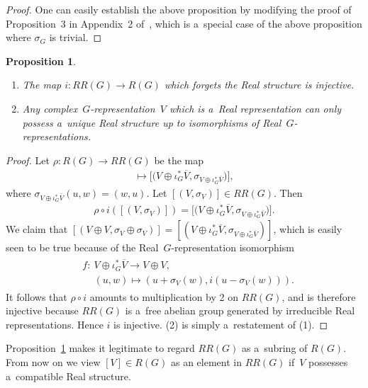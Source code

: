 \documentclass[11pt]{article}
\numberwithin{equation}{section}
\newtheorem{Proposition}[Theorem]{Proposition}
{\theoremstyle{definition}
\newtheorem{Definition}[Theorem]{Definition}
\newtheorem{Example}[Theorem]{Example}
\newtheorem{Remark}[Theorem]{Remark}
}
\begin{document}
\begin{proof}
One can easily establish the above proposition
by modifying the proof of Proposition~3 in Appendix~2 of~\cite{B}, which
is a~special case of the above proposition
where $\sigma_G$ is trivial.
\end{proof}
\begin{Proposition}\label{realforgetfulinj}\quad
\begin{enumerate}\itemsep=0pt
\item[$1.$]
The map
$i: RR(G)\to R(G)$ which forgets the Real structure is injective.
\item[$2.$]
Any complex~$G$-representation~$V$ which is a~Real representation can only possess a~unique Real structure up to
isomorphisms of Real~$G$-representations.
\end{enumerate}
\end{Proposition}
\begin{proof}
Let $\rho: R(G)\to RR(G)$ be the map
\begin{gather*}
[V]\mapsto \big[\big(V\oplus\iota_G^*\overline{V},\sigma_{V\oplus\iota_G^*\overline{V}}\big)\big],
\end{gather*}
where $\sigma_{V\oplus\iota_G^*\overline{V}}(u, w)=(w, u)$.
Let $[(V,
\sigma_V)]\in RR(G)$.
Then
\begin{gather*}
\rho\circ i([(V,\sigma_V)])=\big[\big(V\oplus\iota_G^*\overline{V},\sigma_{V\oplus\iota_G^*\overline{V}}\big)\big].
\end{gather*}
We claim that $[(V\oplus V,\sigma_V\oplus\sigma_V)]=[(V\oplus\iota_G^*\overline{V},
\sigma_{V\oplus\iota_G^*\overline{V}})]$, which is easily seen to be true because of the Real~$G$-representation isomorphism
\begin{gather*}
\begin{split}
& f: \ V\oplus \iota_G^*\overline{V}  \to  V\oplus V,
\\
& \phantom{f:{}} \ (u, w)  \mapsto  (u+\sigma_V(w), i(u-\sigma_V(w))).
\end{split}
\end{gather*}
It follows that $\rho\circ i$ amounts to multiplication by 2 on $RR(G)$, and is therefore injective because $RR(G)$ is
a~free abelian group generated by irreducible Real representations.
Hence $i$ is injective.
(2) is simply a~restatement of (1).
\end{proof}
Proposition~\ref{realforgetfulinj} makes it legitimate to regard $RR(G)$ as a~subring of $R(G)$.
From now on we view $[V]\in R(G)$ as an element in $RR(G)$ if~$V$ possesses a~compatible Real structure.
\end{document}
